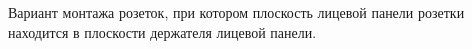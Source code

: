 Вариант монтажа розеток, при котором плоскость лицевой панели 
розетки находится в плоскости держателя лицевой панели.